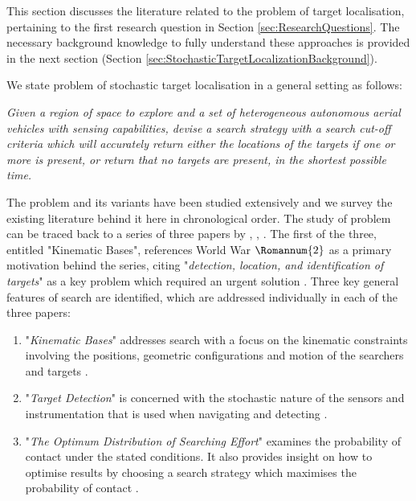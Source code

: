 


This section discusses the literature related to the problem of target localisation, pertaining to the first research question in Section \ref{sec:ResearchQuestions}. The necessary background knowledge to fully understand these approaches is provided in the next section (Section \ref{sec:StochasticTargetLocalizationBackground}).\par


We state problem of stochastic target localisation in a general setting as follows:
\\
   \par \textit{Given a region of space to explore and a set of heterogeneous autonomous aerial vehicles with sensing capabilities, devise a search strategy with a search cut-off criteria which will accurately return either the locations of the targets if one or more is present, or return that no targets are present, in the shortest possible time.}
\\
\par The problem and its variants have been studied extensively and we survey the existing literature behind it here in chronological order. The study of problem can be traced back to a series of three papers by \citeauthor{KoopmanTheoryOfSearchTargetDetection} \cite{Koopman1956THEBASES}, \cite{KoopmanTheoryOfSearchTargetDetection}, \cite{Koopman1957TheEffort}. The first of the three, entitled "Kinematic Bases", references World War $\Romannum{2}$ as a primary motivation behind the series, citing "\textit{detection, location, and identification of targets}" as a key problem which required an urgent solution \cite{Koopman1956THEBASES}. Three key general features of search are identified, which are addressed individually in each of the three papers:
\begin{enumerate}
    \item "\textit{Kinematic Bases}" addresses search with a focus on the kinematic constraints involving the positions, geometric configurations and motion of the searchers and targets \cite{Koopman1956THEBASES}.

    \item "\textit{Target Detection}" is concerned with the stochastic nature of the sensors and instrumentation that is used when navigating and detecting \cite{KoopmanTheoryOfSearchTargetDetection}.
 
    \item "\textit{The Optimum Distribution of Searching Effort}" examines the probability of contact under the stated conditions. It also provides insight on how to optimise results by choosing a search strategy which maximises the probability of contact \cite{Koopman1957TheEffort}.
\end{enumerate}
